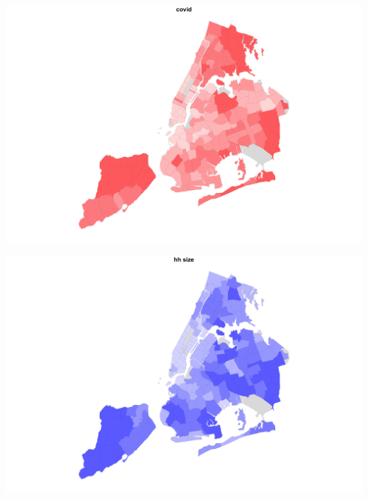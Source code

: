 \documentclass[
  openany]{book}
\newenvironment{Shaded}{\begin{snugshade}}{\end{snugshade}}
\newcommand{\AttributeTok}[1]{\textcolor[rgb]{0.77,0.63,0.00}{#1}}
\newcommand{\DecValTok}[1]{\textcolor[rgb]{0.00,0.00,0.81}{#1}}
\newcommand{\FloatTok}[1]{\textcolor[rgb]{0.00,0.00,0.81}{#1}}
\newcommand{\FunctionTok}[1]{\textcolor[rgb]{0.00,0.00,0.00}{#1}}
\newcommand{\NormalTok}[1]{#1}
\newcommand{\SpecialCharTok}[1]{\textcolor[rgb]{0.00,0.00,0.00}{#1}}
\newcommand{\StringTok}[1]{\textcolor[rgb]{0.31,0.60,0.02}{#1}}
\begin{document}
\begin{center}\includegraphics[width=0.9\linewidth]{carpedatum_files/figure-html/unnamed-chunk-97-1} \end{center}

\begin{Shaded}
\end{Shaded}

\begin{center}\includegraphics[width=0.9\linewidth]{carpedatum_files/figure-html/unnamed-chunk-97-2} \end{center}
\end{document}
